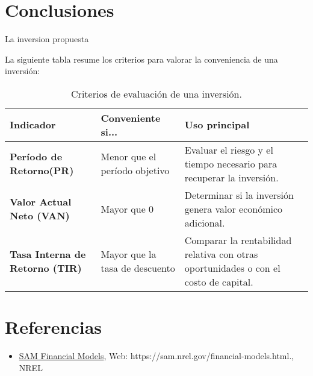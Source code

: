 \documentclass[conference,12pt]{IEEEtran}
\let\OldTextField\TextField
\renewcommand{\TextField}[2][]{%
  \raisebox{-0.3ex}{\OldTextField[height=.85em,  bordercolor={1 1 1}, backgroundcolor={1 1 1},#1]{#2}}%
}
\begin{document}
\begin{Form}
\section{Conclusiones}

La inversion propuesta 
\TextField[name=evaluacion,width=3cm]{}


La siguiente tabla resume los criterios para valorar la conveniencia de una inversión:

\begin{table}[h!]
    \centering
    \begin{tabular}{|>{\raggedright\arraybackslash}p{2cm}|>{\raggedright\arraybackslash}p{2cm}|>{\raggedright\arraybackslash}p{4cm}|}
        \hline
        \textbf{Indicador} & \textbf{Conveniente si...} & \textbf{Uso principal} \\ \hline
        \textbf{Período de Retorno(PR)} & Menor que el período objetivo & Evaluar el riesgo y el tiempo necesario para recuperar la inversión. \\ \hline
        \textbf{Valor Actual Neto (VAN)} & Mayor que 0 & Determinar si la inversión genera valor económico adicional. \\ \hline
        \textbf{Tasa Interna de Retorno (TIR)} & Mayor que la tasa de descuento & Comparar la rentabilidad relativa con otras oportunidades o con el costo de capital. \\ \hline
    \end{tabular}
    \caption{Criterios de evaluación de una inversión.}
    \label{tabla:criterios}
\end{table}

















\section{Referencias}
    \begin{itemize}
        \item \href{https://sam.nrel.gov/financial-models.html}
        {SAM Financial Models}, Web: https://sam.nrel.gov/financial-models.html., NREL
    
    \end{itemize}
\end{Form}
\end{document}
